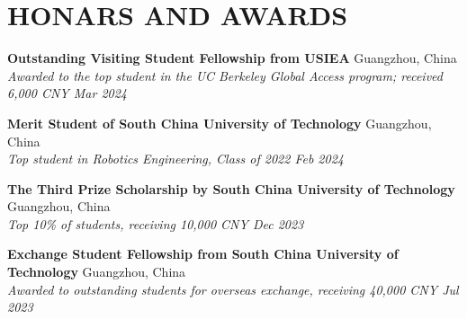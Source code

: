 \documentclass[a4paper,9pt]{extarticle}
\begin{document}

\section*{{\textbf{\fontsize{14pt}{8pt}\selectfont H}\textbf{\scshape ONARS AND AWARDS}}}
\textbf{Outstanding Visiting Student Fellowship from USIEA}  \hfill Guangzhou, China \\
\textit{Awarded to the top student in the UC Berkeley Global Access program; received 6,000 CNY \hfill Mar 2024}
\par\vspace{6pt}\noindent
\textbf{Merit Student of South China University of Technology}  \hfill Guangzhou, China \\
\textit{Top student in Robotics Engineering, Class of 2022 \hfill Feb 2024 }
\par\vspace{6pt}\noindent
\textbf{The Third Prize Scholarship by South China University of Technology}  \hfill Guangzhou, China\\ 
\textit{Top 10\% of students, receiving 10,000 CNY \hfill Dec 2023}
\par\vspace{6pt}\noindent
\textbf{Exchange Student Fellowship from South China University of Technology}  \hfill Guangzhou, China\\ 
\textit{Awarded to outstanding students for overseas exchange, receiving 40,000 CNY  \hfill Jul 2023} 
\end{document}
